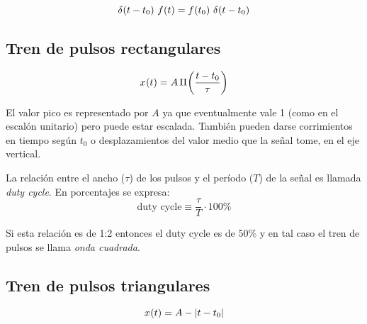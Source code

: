 \begin{mdframed}[style=PropertyFrame]
    \begin{prop}
    \end{prop}
    \begin{equation*}
        \fx[\delta]{t-t_0} \, \fx{t} = \fx{t_0} \, \fx[\delta]{t-t_0}
    \end{equation*}
\end{mdframed}

\subsection{Tren de pulsos rectangulares}

\begin{equation*}
    \fx[x]{t} = A \, \pulse[t_0]{t}{\tau}
\end{equation*}

\begin{center}
    \def\svgwidth{0.8\linewidth}
    
\end{center}

El valor pico es representado por $A$ ya que eventualmente vale 1 (como en el escalón unitario) pero puede estar escalada.
También pueden darse corrimientos en tiempo según $t_0$ o desplazamientos del valor medio que la señal tome, en el eje vertical.

La relación entre el ancho ($\tau$) de los pulsos y el período ($T$) de la señal es llamada \emph{duty cycle}.
En porcentajes se expresa:
\begin{equation*}
    \text{duty cycle}  \equiv \frac{\tau}{T} \cdot 100\%
\end{equation*}

Si esta relación es de 1:2 entonces el duty cycle es de $50\%$ y en tal caso el tren de pulsos se llama \emph{onda cuadrada}.

\subsection{Tren de pulsos triangulares}

\begin{equation*}
    \fx[x]{t} = A - \norm{t-t_0}
\end{equation*}

\begin{center}
    \def\svgwidth{0.8\linewidth}
    
\end{center}

